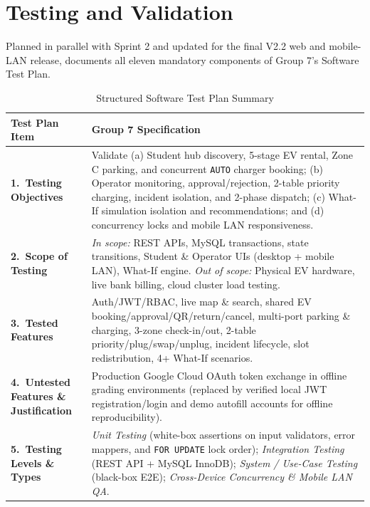 \section{Testing and Validation}
\label{sec:testing}

\label{subsec:test-plan}
Planned in parallel with Sprint 2 and updated for the final V2.2 web and mobile-LAN release,  documents all eleven mandatory components of Group 7's Software Test Plan.

\begin{table}[H]
  \centering
  \singlespacing\footnotesize
  \caption{Structured Software Test Plan Summary}
  \label{tab:test-plan}
  \renewcommand{\arraystretch}{1.22}
  \begin{tabularx}{\textwidth}{|L{3.5cm}|Y|}
    \hline
    \textbf{Test Plan Item} & \textbf{Group 7 Specification} \\
    \hline
    \textbf{1.\ Testing Objectives} & Validate (a) Student hub discovery, 5-stage EV rental, Zone C parking, and concurrent \texttt{AUTO} charger booking; (b) Operator monitoring, approval/rejection, 2-table priority charging, incident isolation, and 2-phase dispatch; (c) What-If simulation isolation and recommendations; and (d) concurrency locks and mobile LAN responsiveness. \\
    \hline
    \textbf{2.\ Scope of Testing} & \emph{In scope:} REST APIs, MySQL transactions, state transitions, Student \& Operator UIs (desktop + mobile LAN), What-If engine. \emph{Out of scope:} Physical EV hardware, live bank billing, cloud cluster load testing. \\
    \hline
    \textbf{3.\ Tested Features} & Auth/JWT/RBAC, live map \& search, shared EV booking/approval/QR/return/cancel, multi-port parking \& charging, 3-zone check-in/out, 2-table priority/plug/swap/unplug, incident lifecycle, slot redistribution, 4+ What-If scenarios. \\
    \hline
    \textbf{4.\ Untested Features \& Justification} & Production Google Cloud OAuth token exchange in offline grading environments (replaced by verified local JWT registration/login and demo autofill accounts for offline reproducibility). \\
    \hline
    \textbf{5.\ Testing Levels \& Types} & \emph{Unit Testing} (white-box assertions on input validators, error mappers, and \texttt{FOR UPDATE} lock order); \emph{Integration Testing} (REST API + MySQL InnoDB); \emph{System / Use-Case Testing} (black-box E2E); \emph{Cross-Device Concurrency \& Mobile LAN QA}. \\

\end{tabularx}
\end{table}
